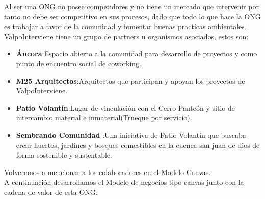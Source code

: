\documentclass[paper=letter, fontsize=11pt]{scrartcl} %
\numberwithin{equation}{section} %
\numberwithin{figure}{section} %
\numberwithin{table}{section} %
\begin{document}
Al ser una ONG no posee competidores y no tiene un mercado que intervenir por tanto no debe ser competitivo en sus procesos, dado que todo lo que hace la ONG es trabajar a favor de la comunidad y fomentar buenas practicas ambientales.\\

ValpoInterviene tiene un grupo de partners u organismos asociados, estos son:
\begin{itemize}
\item \textbf{Áncora}:Espacio abierto a la comunidad para desarrollo de proyectos y como punto de encuentro social de coworking.
\item \textbf{M25 Arquitectos}:Arquitectos que participan y apoyan los proyectos de ValpoInterviene.
\item \textbf{Patio Volantín}:Lugar de vinculación con el Cerro Panteón y sitio de intercambio material e inmaterial(Trueque por servicio).
\item \textbf{Sembrando Comunidad} :Una iniciativa de Patio Volantín que buscaba crear huertos, jardines y bosques comestibles en la cuenca san juan de dios de forma sostenible y sustentable.
\end{itemize}
Volveremos a mencionar a los colaboradores en el Modelo Canvas.\\
A continuación desarrollamos el Modelo de negocios tipo canvas junto con la cadena de valor de esta ONG.
\end{document}
